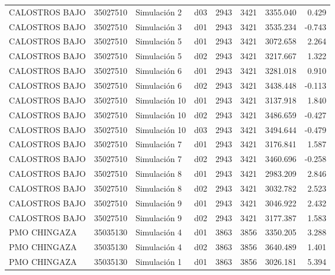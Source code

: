 \begin{landscape}
\begin{longtable}{lrlp{2cm}p{2cm}p{3cm}p{2cm}r}
          CALOSTROS BAJO &  35027510 &   Simulación 2 &   d03 &      2943 &     3421 &  3355.040 &     0.429 \\
          CALOSTROS BAJO &  35027510 &   Simulación 3 &   d01 &      2943 &     3421 &  3535.234 &    -0.743 \\
          CALOSTROS BAJO &  35027510 &   Simulación 5 &   d01 &      2943 &     3421 &  3072.658 &     2.264 \\
          CALOSTROS BAJO &  35027510 &   Simulación 5 &   d02 &      2943 &     3421 &  3217.667 &     1.322 \\
          CALOSTROS BAJO &  35027510 &   Simulación 6 &   d01 &      2943 &     3421 &  3281.018 &     0.910 \\
          CALOSTROS BAJO &  35027510 &   Simulación 6 &   d02 &      2943 &     3421 &  3438.448 &    -0.113 \\
          CALOSTROS BAJO &  35027510 &  Simulación 10 &   d01 &      2943 &     3421 &  3137.918 &     1.840 \\
          CALOSTROS BAJO &  35027510 &  Simulación 10 &   d02 &      2943 &     3421 &  3486.659 &    -0.427 \\
          CALOSTROS BAJO &  35027510 &  Simulación 10 &   d03 &      2943 &     3421 &  3494.644 &    -0.479 \\
          CALOSTROS BAJO &  35027510 &   Simulación 7 &   d01 &      2943 &     3421 &  3176.841 &     1.587 \\
          CALOSTROS BAJO &  35027510 &   Simulación 7 &   d02 &      2943 &     3421 &  3460.696 &    -0.258 \\
          CALOSTROS BAJO &  35027510 &   Simulación 8 &   d01 &      2943 &     3421 &  2983.209 &     2.846 \\
          CALOSTROS BAJO &  35027510 &   Simulación 8 &   d02 &      2943 &     3421 &  3032.782 &     2.523 \\
          CALOSTROS BAJO &  35027510 &   Simulación 9 &   d01 &      2943 &     3421 &  3046.922 &     2.432 \\
          CALOSTROS BAJO &  35027510 &   Simulación 9 &   d02 &      2943 &     3421 &  3177.387 &     1.583 \\
            PMO CHINGAZA &  35035130 &   Simulación 4 &   d01 &      3863 &     3856 &  3350.205 &     3.288 \\
            PMO CHINGAZA &  35035130 &   Simulación 4 &   d02 &      3863 &     3856 &  3640.489 &     1.401 \\
            PMO CHINGAZA &  35035130 &   Simulación 1 &   d01 &      3863 &     3856 &  3026.181 &     5.394 \\

\end{longtable}
\end{landscape}
